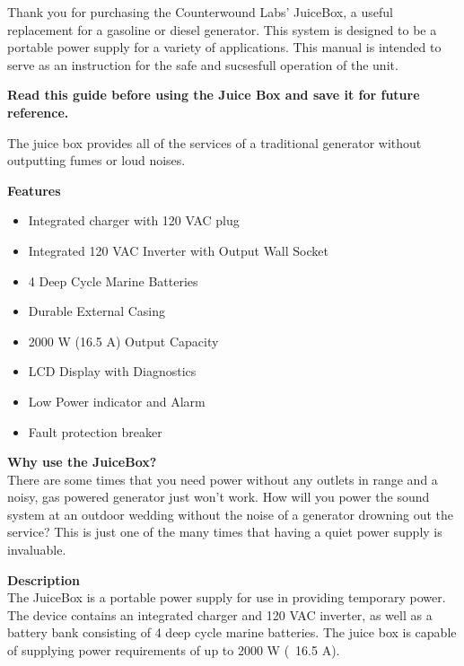 \documentclass[../jb_user_manual.tex]{subfiles}
\begin{document}
\begin{flushleft}

\par Thank you for purchasing the Counterwound Labs' JuiceBox, a useful replacement for a gasoline or diesel generator. This system is designed to be a portable power supply for a variety of applications. This manual is intended to serve as an instruction for the safe and sucsesfull operation of the unit.

\vspace{2mm} 
\noindent 
\textbf{Read this guide before using the Juice Box and save it for future reference.}

\vspace{2mm}
The juice box provides all of the services of a traditional generator without outputting fumes or loud noises.

\vspace{4mm}
\begin{Large}
	\textbf{Features}
\end{Large}

\begin{itemize}
	\item{Integrated charger with 120 VAC plug}
	\item{Integrated 120 VAC Inverter with Output Wall Socket}
	\item{4 Deep Cycle Marine Batteries}
	\item{Durable External Casing}
	\item{2000 W (16.5 A) Output Capacity}
	\item{LCD Display with Diagnostics}
	\item{Low Power indicator and Alarm}
	\item{Fault protection breaker} 

\end{itemize}

\textbf{Why use the JuiceBox?} \\
There are some times that you need power without any outlets in range and a noisy, gas powered generator just won't work. How will you power the sound system at an outdoor wedding without the noise of a generator drowning out the service? This is just one of the many times that having a quiet power supply is invaluable. 

\vspace{3mm}

\textbf{Description} \\
The JuiceBox is a portable power supply for use in providing temporary power.  The device contains an integrated charger and 120 VAC inverter, as well as a battery bank consisting of 4 deep cycle marine batteries.  The juice box is capable of supplying power requirements of up to 2000 W (~16.5 A).

\end{flushleft}
\end{document}
